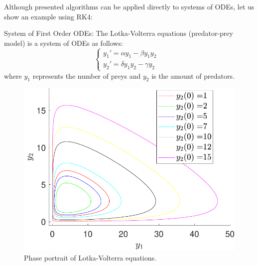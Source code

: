     Although presented algorithms can be applied directly to systems of ODEs, let us show an example using RK4:
\begin{exmp} System of First Order ODEs:
    The Lotka-Volterra equations (predator-prey model) is a system of ODEs as follows:
\begin{equation}
    \begin{cases}{y_1'=\alpha y_1-\beta y_1 y_2}& \\ {y_2'=\delta y_1 y_2-\gamma y_2}&\end{cases}
\end{equation}
where $y_1$ represents the number of preys and $y_2$ is the amount of predators.

\begin{figure}[H]
    \centering
    \includegraphics[scale=0.4]{files/Prey.pdf}
    \caption{Phase portrait of Lotka-Volterra equations.}
    \label{fig:lotka}
\end{figure}
\end{exmp}
